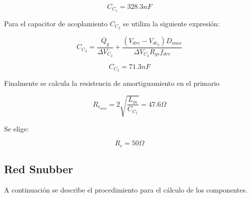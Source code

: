 $$ C_{C_1}=328.3nF $$

Para el capacitor de acoplamiento $C_{C_2}$ se utiliza la siguiente expresión:

$$ C_{C_2}=\frac{Q_g}{\Delta V_{C_2}}+\frac{(V_{drv}-V_{dc_2})D_{max}}{\Delta V_{C_2}R_{gs}f_{drv}} $$

$$ C_{C_2}=71.3nF $$

Finalmente se calcula la resistencia de amortiguamiento en el primario

$$ R_{c_{min}}=2\sqrt{\frac{L_m}{C_{C_1}}}=47.6\Omega $$

Se elige:

$$ R_c=50\Omega $$

\subsection{Red Snubber}

A continuación se describe el procedimiento para el cálculo de los componentes. 

